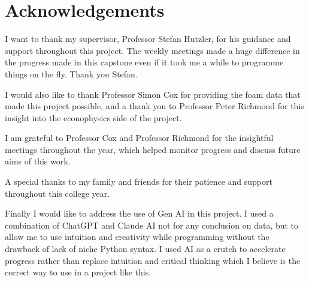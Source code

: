 \section{Acknowledgements} \label{sec:acknowledgements}

I want to thank my supervisor, Professor Stefan Hutzler, for his guidance and support throughout this project. The weekly meetings made a huge difference in the progress made in this capstone even if it took me a while to programme things on the fly. Thank you Stefan.

I would also like to thank Professor Simon Cox for providing the foam data that made this project possible, and a thank you to Professor Peter Richmond for this insight into the econophysics side of the project.

I am grateful to Professor Cox and Professor Richmond for the insightful meetings throughout the year, which helped monitor progress and discuss future aims of this work.

A special thanks to my family and friends for their patience and support throughout this college year.

Finally I would like to address the use of Gen AI in this project. I used a combination of ChatGPT and Claude AI not for any conclusion on data, but to allow me to use intuition and creativity while programming without the drawback of lack of niche Python syntax. I used AI as a crutch to accelerate progress rather than replace intuition and critical thinking which I believe is the correct way to use in a project like this.